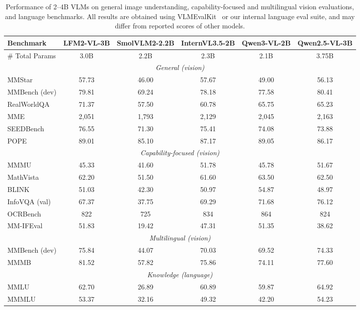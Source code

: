 \documentclass{article}
\begin{document}
\begin{table}[h]
\centering
\small
\begin{tabular}{lccccc}
\toprule
\textbf{Benchmark} & \textbf{LFM2-VL-3B} & \textbf{SmolVLM2-2.2B} & \textbf{InternVL3.5-2B} & \textbf{Qwen3-VL-2B} & \textbf{Qwen2.5-VL-3B} \\
\midrule
\# Total Params & 3.0B & 2.2B & 2.3B & 2.1B & 3.75B \\
\midrule
\multicolumn{6}{c}{\textit{General (vision)}} \\
\midrule
MMStar           & 57.73  & 46.00    & 57.67    & 49.00    & 56.13   \\
MMBench (dev)    & 79.81  & 69.24    & 78.18    & 77.58    & 80.41   \\
RealWorldQA      & 71.37  & 57.50    & 60.78    & 65.75    & 65.23   \\
MME              & 2,051 & 1,793 & 2,129 & 2,045 & 2,163\\
SEEDBench        & 76.55  & 71.30    & 75.41    & 74.08    & 73.88   \\
POPE             & 89.01  & 85.10    & 87.17    & 89.05    & 86.17   \\
\midrule
\multicolumn{6}{c}{\textit{Capability-focused (vision)}} \\
\midrule
MMMU             & 45.33  & 41.60  & 51.78  & 45.78  & 51.67  \\
MathVista        & 62.20  & 51.50  & 61.60  & 63.50  & 62.50  \\
BLINK            & 51.03  & 42.30  & 50.97  & 54.87  & 48.97  \\
InfoVQA (val)    & 67.37  & 37.75  & 69.29  & 71.68  & 76.12  \\
OCRBench         & 822 & 725 & 834 & 864 & 824 \\
MM-IFEval        & 51.83  & 19.42  & 47.31  & 51.35  & 38.62  \\
\midrule
\multicolumn{6}{c}{\textit{Multilingual (vision)}} \\
\midrule
MMBench (dev) & 75.84 & 44.07  & 70.03 & 69.52  & 74.33  \\
MMMB          & 81.52 & 57.82  & 75.86  & 74.11  & 77.60 \\
\midrule
\multicolumn{6}{c}{\textit{Knowledge (language)}} \\
\midrule
MMLU          &  62.70 &  26.89  &  60.89  &  59.87  &  64.92 \\
MMMLU         &  53.37 &  32.16  &  49.32  &  42.20  &  54.23 \\
\bottomrule
\end{tabular}
\caption{Performance of 2--4B VLMs on general image understanding, capability-focused and multilingual vision evaluations, and language benchmarks. All results are obtained using VLMEvalKit~\citep{duan2025vlmevalkitopensourcetoolkitevaluating} or our internal language eval suite, and may differ from reported scores of other models.}
\label{tab:vl-capability}
\end{table}
\clearpage
\end{document}
